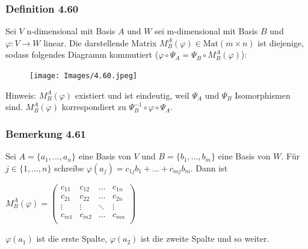 \documentclass{article}
\begin{document}
\subsubsection*{Definition 4.60}
Sei $V$ n-dimensional mit Basis $A$ und $W$ sei m-dimensional mit Basis $B$ und $\varphi: V \rightarrow W$ linear. Die darstellende Matrix $M_B^{A}(\varphi) \in \text{Mat}(m \times n)$ ist diejenige, sodass folgendes Diagramm kommutiert ($\varphi \circ \varPsi_A = \varPsi_B \circ M_B^{A}(\varphi)$): \\
\begin{center}
    \begin{figure}[h]
        \centering
        \texttt{[image: Images/4.60.jpeg]}
    \end{figure}
\end{center}
Hinweis: $M_B^{A}(\varphi)$ existiert und ist eindeutig, weil $\varPsi_A$ und $\varPsi_B$ Isomorphismen sind. $M_B^{A}(\varphi)$ korrespondiert zu $\varPsi_B^{-1} \circ \varphi \circ \varPsi_A$. \\
\subsubsection*{Bemerkung 4.61}
Sei $A = \{a_1,...,a_n\}$ eine Basis von $V$ und $B = \{b_1,...,b_m\}$ eine Basis von $W$. Für $j \in \{1,...,n\}$ schreibe $\varphi(a_j) = c_{1j} b_1 + ... + c_{mj} b_m$. Dann ist \\ 
\begin{center}
    $M_B^{A}(\varphi) = \begin{pmatrix}
        c_{11} & c_{12} & ... & c_{1n} \\
        c_{21} & c_{22} & ... & c_{2n} \\
        \vdots & \vdots & \ddots & \vdots \\
        c_{m1} & c_{m2} & ... & c_{mn} \\
    \end{pmatrix}$ \\
\end{center}
$\varphi(a_1)$ ist die erste Spalte, $\varphi(a_2)$ ist die zweite Spalte und so weiter. \\
\\
\end{document}
